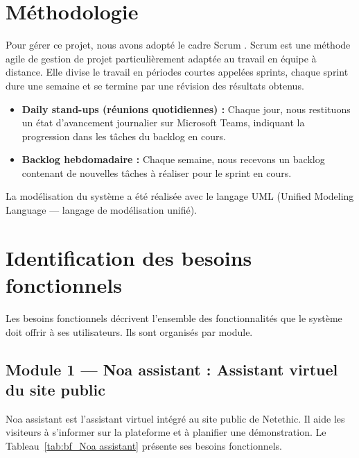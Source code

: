 \section{Méthodologie}

Pour gérer ce projet, nous avons adopté le cadre Scrum \cite{scrumguide}.
Scrum est une méthode agile de gestion de projet particulièrement adaptée au travail en équipe à distance.
Elle divise le travail en périodes courtes appelées sprints, chaque sprint dure une semaine et se termine par une révision des résultats obtenus.

\begin{itemize}
    \item \textbf{Daily stand-ups (réunions quotidiennes) :}
          Chaque jour, nous restituons un état d'avancement journalier sur Microsoft Teams, indiquant la progression dans les tâches du backlog en cours.
    \item \textbf{Backlog hebdomadaire :}
          Chaque semaine, nous recevons un backlog contenant de nouvelles tâches à réaliser pour le sprint en cours.
\end{itemize}

La modélisation du système a été réalisée avec le langage UML (Unified Modeling Language — langage de modélisation unifié).


\section{Identification des besoins fonctionnels}

Les besoins fonctionnels décrivent l'ensemble des fonctionnalités que le système doit
offrir à ses utilisateurs. Ils sont organisés par module.

\subsection{Module 1 — Noa assistant : Assistant virtuel du site public}

Noa assistant est l'assistant virtuel intégré au site public de Netethic.
Il aide les visiteurs à s'informer sur la plateforme et à planifier une démonstration.
Le Tableau~\ref{tab:bf_Noa assistant} présente ses besoins fonctionnels.

